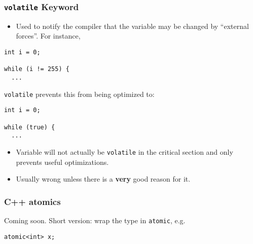 \documentclass[aspectratio=43]{beamer}
\newenvironment{changemargin}[1]{%
  \begin{list}{}{%
    \setlength{\topsep}{0pt}%
    \setlength{\leftmargin}{#1}%
    \setlength{\rightmargin}{1em}
    \setlength{\listparindent}{\parindent}%
    \setlength{\itemindent}{\parindent}%
    \setlength{\parsep}{\parskip}%
  }%
  \item[]}{\end{list}}
\begin{document}
\begin{frame}[fragile]
  \frametitle{{\tt volatile} Keyword}

\begin{changemargin}{1.5cm}
  \begin{itemize}
    \item Used to notify the compiler that the variable may be changed by ``external forces''. For instance,
  \end{itemize}

  \begin{lstlisting}
int i = 0;

while (i != 255) {
  ...
  \end{lstlisting}

{\tt volatile} prevents this from being optimized to:

  \begin{lstlisting}
int i = 0;

while (true) {
  ...
  \end{lstlisting}

  \begin{itemize}
    \item Variable will not actually be {\tt volatile} in the critical section
      and only prevents useful optimizations.
    \item Usually wrong unless there is a {\bf very} good reason for it.
  \end{itemize}
\end{changemargin}

\end{frame}

\begin{frame}
  \frametitle{C++ atomics}

  Coming soon. Short version: wrap the type in {\tt atomic}, e.g.

  {\tt atomic<int> x;}
\end{frame}
\end{document}
